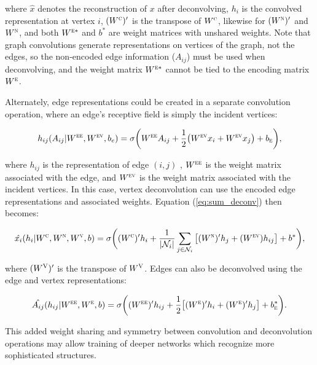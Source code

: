 \noindent
where $\hat{x}$ denotes the reconstruction of $x$ after deconvolving, $h_i$ is the convolved representation at vertex $i$, $(W^\textsc{c})'$ is the transpose of $W^\textsc{c}$, likewise for $(W^\textsc{n})'$ and $W^\textsc{n}$, and both $W^{\textsc{e}*}$ and $b^*$ are weight matrices with unshared weights. 
Note that graph convolutions generate representations on vertices of the graph, not the edges, so the non-encoded edge information ($A_{ij}$) must be used when deconvolving, and the weight matrix $W^{\textsc{e}*}$ cannot be tied to the encoding matrix $W^{\textsc{e}}$.

Alternately, edge representations could be created in a separate convolution operation, where an edge's receptive field is simply the incident vertices:

\begin{equation}
h_{ij}(A_{ij} |W^{\textsc{ee}}, W^{\textsc{ev}}, b_e) = \sigma\bigg( W^{\textsc{ee}} A_{ij} + \frac{1}{2}\big(
W^{\textsc{ev}} x_i + W^{\textsc{ev}} x_j \big) + b_\textsc{e} \bigg),
\label{eq:edge_conv}
\end{equation}

\noindent
where $h_{ij}$ is the representation of edge $(i, j)$ , $W^{\textsc{ee}}$ is the weight matrix associated with the edge, and $W^{\textsc{ev}}$ is the weight matrix associated with the incident vertices.
In this case, vertex deconvolution can use the encoded edge representations and associated weights.
Equation (\ref{eq:sum_deconv}) then becomes:

\begin{equation}
\hat{x_i}(h_i | W^\textsc{c}, W^\textsc{n}, W^\textsc{v}, b) = \sigma \bigg( (W^{\textsc{c}})' h_i + \frac{1}{|\mathcal{N}_i|}\sum_{j \in \mathcal{N}_i} \big[ (W^{\textsc{n}})' h_j + (W^{\textsc{ev}}) h_{ij} \big] + b^* \bigg),
\label{eq:sum_deconv2}
\end{equation}

\noindent
where $(W^{\textsc{V}})'$ is the transpose of $W^{\textsc{V}}$.
Edges can also be deconvolved using the edge and vertex representations:

\begin{equation}
\hat{A_{ij}}(h_{ij} | W^{\textsc{ee}}, W^{\textsc{e}}, b) = \sigma \bigg( (W^{\textsc{ee}})' h_{ij} + \frac{1}{2}\big[
(W^{\textsc{e}})' h_i + (W^{\textsc{e}})' h_j \big] + b^{*}_\textsc{e} \bigg).
\label{eq:edge_deconv}
\end{equation}

\noindent
This added weight sharing and symmetry between convolution and deconvolution operations may allow training of deeper networks which recognize more sophisticated structures.



